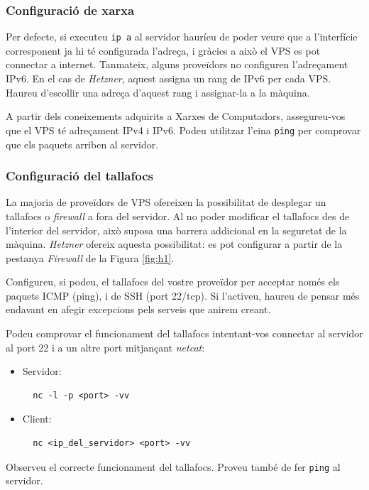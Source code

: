 \documentclass{practicaitic}
\begin{document}
\subsubsection{Configuració de xarxa}

Per defecte, si executeu \texttt{ip a} al servidor hauríeu de poder veure
que a l'interfície corresponent ja hi té configurada l'adreça, i gràcies a
això el VPS es pot connectar a internet. Tanmateix, alguns proveïdors no configuren
l'adreçament IPv6. En el cas de \textit{Hetzner}, aquest assigna un rang de IPv6
per cada VPS. Haureu d'escollir una adreça d'aquest rang i assignar-la a la màquina.

\begin{previ}
A partir dels coneixements adquirits a Xarxes de Computadors, assegureu-vos
que el VPS té adreçament IPv4 i IPv6. Podeu utilitzar l'eina \texttt{ping} per comprovar
que els paquets arriben al servidor.
\end{previ}

\subsubsection{Configuració del tallafocs}


La majoria de proveïdors de VPS ofereixen la possibilitat de desplegar un
tallafocs o \textit{firewall} a fora del servidor. Al no poder modificar el tallafocs
des de l'interior del servidor, això suposa una barrera addicional en la seguretat
de la màquina. \textit{Hetzner} ofereix aquesta possibilitat: es pot configurar
a partir de la pestanya \textit{Firewall} de la Figura \ref{fig:h1}.

\begin{previ}
Configureu, si podeu, el tallafocs del vostre proveïdor per acceptar només
els paquets ICMP (ping), i de SSH (port 22/tcp). Si l'activeu, haureu de pensar més endavant en
afegir excepcions pels serveis que anirem creant.

Podeu comprovar el funcionament del tallafocs intentant-vos connectar al
servidor al port 22 i a un altre port mitjançant \textit{netcat}:
\begin{itemize}
\item Servidor:
\begin{verbatim}
  nc -l -p <port> -vv
\end{verbatim}
\item Client:
\begin{verbatim}
  nc <ip_del_servidor> <port> -vv
\end{verbatim}
\end{itemize}
  
Observeu el correcte funcionament del tallafocs. Proveu també de fer
\texttt{ping} al servidor.
\end{previ}
\end{document}
